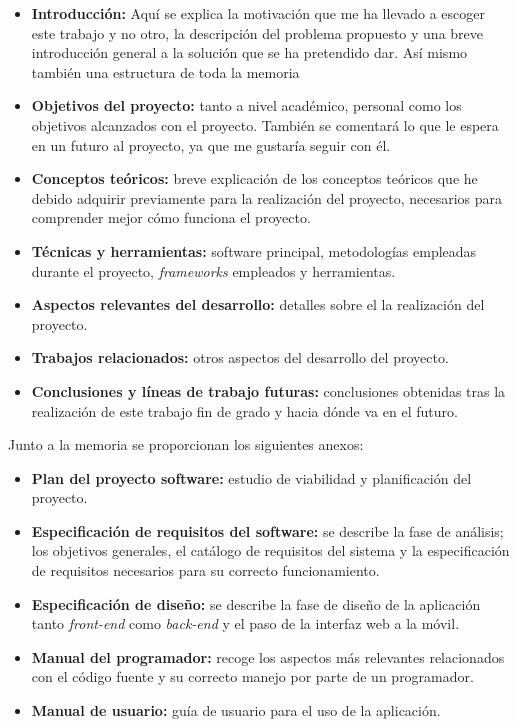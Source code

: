 \begin{itemize}
\tightlist
\item
  \textbf{Introducción:} Aquí se explica la motivación que me ha llevado a escoger este trabajo y no otro, la descripción del problema propuesto y una breve introducción general a la solución que se ha pretendido dar. Así mismo también una estructura de toda la memoria 
\item
  \textbf{Objetivos del proyecto:} tanto a nivel académico, personal como los objetivos alcanzados con el proyecto. También se comentará lo que le espera en un futuro al proyecto, ya que me gustaría seguir con él.
\item
  \textbf{Conceptos teóricos:} breve explicación de los conceptos
  teóricos que he debido adquirir previamente para la realización del proyecto, necesarios para comprender mejor cómo funciona el proyecto.
\item
  \textbf{Técnicas y herramientas:} software principal, metodologías empleadas durante el proyecto, \emph{frameworks} empleados y herramientas.
\item
  \textbf{Aspectos relevantes del desarrollo:} detalles sobre el la realización del proyecto.
\item
  \textbf{Trabajos relacionados:} otros aspectos del desarrollo del proyecto.
\item
  \textbf{Conclusiones y líneas de trabajo futuras:} conclusiones
  obtenidas tras la realización de este trabajo fin de grado y hacia dónde va en el futuro.
\end{itemize}

Junto a la memoria se proporcionan los siguientes anexos:

\begin{itemize}
\tightlist
\item
  \textbf{Plan del proyecto software:} estudio de viabilidad y planificación del proyecto.
\item
  \textbf{Especificación de requisitos del software:} se describe la
  fase de análisis; los objetivos generales, el catálogo de requisitos
  del sistema y la especificación de requisitos necesarios para su correcto funcionamiento.
\item
  \textbf{Especificación de diseño:} se describe la fase de diseño de la aplicación tanto \emph{front-end} como \emph{back-end} y el paso de la interfaz web a la móvil.
\item
  \textbf{Manual del programador:} recoge los aspectos más relevantes
  relacionados con el código fuente y su correcto manejo por parte de un programador.
\item
  \textbf{Manual de usuario:} guía de usuario para el uso de la aplicación.
\end{itemize}

